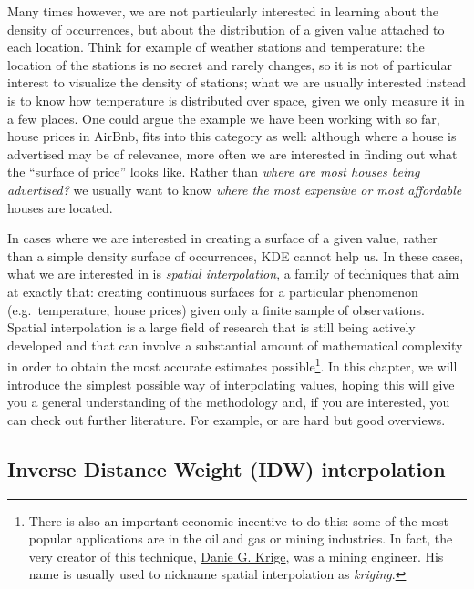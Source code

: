 \documentclass[
]{book}
\begin{document}
Many times however, we are not particularly interested in learning about the density of occurrences, but about the distribution of a given value attached to each location. Think for example of weather stations and temperature: the location of the stations is no secret and rarely changes, so it is not of particular interest to visualize the density of stations; what we are usually interested instead is to know how temperature is distributed over space, given we only measure it in a few places. One could argue the example we have been working with so far, house prices in AirBnb, fits into this category as well: although where a house is advertised may be of relevance, more often we are interested in finding out what the ``surface of price'' looks like. Rather than \emph{where are most houses being advertised?} we usually want to know \emph{where the most expensive or most affordable} houses are located.

In cases where we are interested in creating a surface of a given value, rather than a simple density surface of occurrences, KDE cannot help us. In these cases, what we are interested in is \emph{spatial interpolation}, a family of techniques that aim at exactly that: creating continuous surfaces for a particular phenomenon (e.g.~temperature, house prices) given only a finite sample of observations. Spatial interpolation is a large field of research that is still being actively developed and that can involve a substantial amount of mathematical complexity in order to obtain the most accurate estimates possible\footnote{There is also an important economic incentive to do this: some of the most popular applications are in the oil and gas or mining industries. In fact, the very creator of this technique, \href{https://en.wikipedia.org/wiki/Danie_G._Krige}{Danie G. Krige}, was a mining engineer. His name is usually used to nickname spatial interpolation as \emph{kriging}.}. In this chapter, we will introduce the simplest possible way of interpolating values, hoping this will give you a general understanding of the methodology and, if you are interested, you can check out further literature. For example, \citet{banerjee2014hierarchical} or \citet{cressie2015statistics} are hard but good overviews.

\hypertarget{inverse-distance-weight-idw-interpolation}{%
\subsection{Inverse Distance Weight (IDW) interpolation}\label{inverse-distance-weight-idw-interpolation}}
\end{document}
